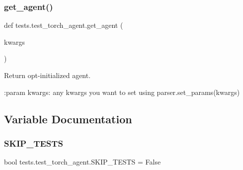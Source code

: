 \subsubsection{\texorpdfstring{get\+\_\+agent()}{get\_agent()}}
{\footnotesize\ttfamily def tests.\+test\+\_\+torch\+\_\+agent.\+get\+\_\+agent (\begin{DoxyParamCaption}\item[{}]{kwargs }\end{DoxyParamCaption})}

\begin{DoxyVerb}Return opt-initialized agent.

:param kwargs: any kwargs you want to set using parser.set_params(\*\*kwargs)
\end{DoxyVerb}
 

\subsection{Variable Documentation}
\mbox{\label{namespacetests_1_1test__torch__agent_a158dbc1f1b2ee55f020fb0ad7a99c116}} 
\subsubsection{\texorpdfstring{S\+K\+I\+P\+\_\+\+T\+E\+S\+TS}{SKIP\_TESTS}}
{\footnotesize\ttfamily bool tests.\+test\+\_\+torch\+\_\+agent.\+S\+K\+I\+P\+\_\+\+T\+E\+S\+TS = False}

